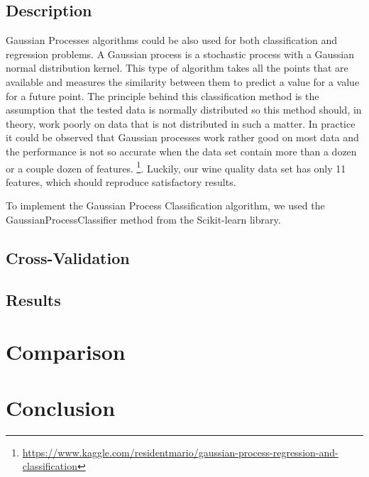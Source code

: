 \documentclass[twocolumn]{scrartcl}
\begin{document}
\subsection{Description}
Gaussian Processes algorithms could be also used for both classification and regression problems. A Gaussian process is a stochastic process with a Gaussian normal distribution kernel. This type of algorithm takes all the points that are available and measures the similarity between them to predict a value for a value for a future point.
The principle behind this classification method is the assumption that the tested data is normally distributed so this method should, in theory, work poorly on data that is not distributed in such a matter. In practice it could be observed that Gaussian processes work rather good on most data and the performance is not so accurate when the data set contain more than a dozen or a couple dozen of features.
\footnote{\url{https://www.kaggle.com/residentmario/gaussian-process-regression-and-classification}}.
Luckily, our wine quality data set has only 11 features, which should reproduce satisfactory results.

To implement the Gaussian Process Classification algorithm, we used the GaussianProcessClassifier method from the Scikit-learn library.
\subsection{Cross-Validation}
\subsection{Results}

\section{Comparison}
\section{Conclusion}

\printbibliography
\end{document}
